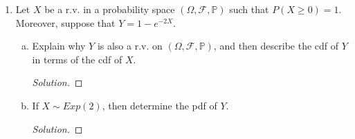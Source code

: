 \documentclass[12pt]{article}
\newenvironment{solution}
{\renewcommand\qedsymbol{$\blacksquare$}\begin{proof}[Solution]}
{\end{proof}}
\begin{document}
\begin{enumerate}
\begin{enumerate}[(a)]
\begin{solution}
\begin{equation*}
                            \mathbb{P}(A)=1-\mathbb{P}(A^c)=\bigg(\frac{5}{6}\bigg)^{k+1}.
                        \end{equation*}
                        Similarly, $\mathbb{P}(B)=1-\mathbb{P}(B^c)$. And $B^c$
                        is the event that $Y\leq 1$. Seeing as $Y$ can be 1 at
                        the smallest, then this is equivalent to
                        $\mathbb{P}(Y=1)=\frac{1}{6}$. Thus
                        $\mathbb{P}(B)=1-\frac{1}{6}=\frac{5}{6}$. Therefore
                        \begin{equation*}
                            \mathbb{P}(Y>1+k\mid
                            Y>1)=\frac{\mathbb{P}(A)}{\mathbb{P}(B)}
                            =\frac{\big(\frac{5}{6}\big)^{k+1}}{\big(\frac{5}{6})}
                            =\bigg(\frac{5}{6}\bigg)^k.
                        \end{equation*}
                    \end{solution}
            \end{enumerate}
        \item Let $X$ be a r.v. in a probability space $(\Omega, \mathcal{F},
            \mathbb{P})$ such that $P(X\geq 0)=1$. Moreover, suppose that
            $Y=1-e^{-2X}$.
            \begin{enumerate}[(a)]
                \item Explain why $Y$ is also a r.v. on $(\Omega, \mathcal{F},
                    \mathbb{P})$, and then describe the cdf of $Y$ in terms of
                    the cdf of $X$. 
                    \begin{solution}
                        
                    \end{solution}
                \item If $X\sim Exp(2)$, then determine the pdf of $Y$. 
                    \begin{solution}
                        
                    \end{solution}
            \end{enumerate}
    \end{enumerate}
\end{document}
